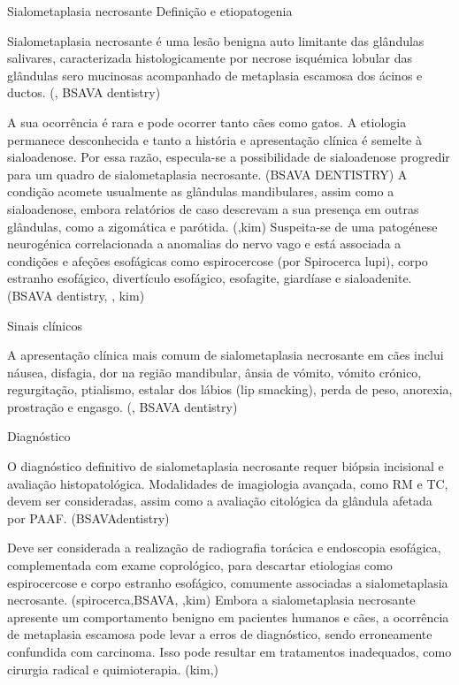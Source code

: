 Sialometaplasia necrosante
Definição e etiopatogenia


Sialometaplasia necrosante é uma lesão benigna auto limitante das glândulas salivares, caracterizada histologicamente	por necrose isquémica lobular das glândulas sero mucinosas acompanhado de metaplasia escamosa dos ácinos e ductos. (\cite{Mukaratirwa2015}, BSAVA dentistry) 


A sua ocorrência é rara e pode ocorrer tanto cães como gatos. A etiologia permanece desconhecida e tanto a história e apresentação clínica é semel\cite{Han2016}te à sialoadenose. Por essa razão, especula-se a possibilidade de sialoadenose progredir para um quadro de sialometaplasia necrosante. (BSAVA DENTISTRY) A condição acomete usualmente as glândulas mandibulares, assim como a sialoadenose, embora relatórios de caso descrevam a sua presença em outras glândulas, como a zigomática e parótida. (\cite{cvj},kim) Suspeita-se de uma patogénese neurogénica correlacionada a anomalias do nervo vago  e está associada a condições e afeções esofágicas como espirocercose (por Spirocerca lupi), corpo estranho esofágico, divertículo esofágico, esofagite, giardíase e sialoadenite. (BSAVA dentistry, \cite{schoroeder}, kim)


Sinais clínicos


A apresentação clínica mais comum de sialometaplasia necrosante em cães inclui náusea, disfagia, dor na região mandibular, ânsia de vómito, vómito crónico, regurgitação, ptialismo, estalar dos lábios (lip smacking), perda de peso, anorexia, prostração e engasgo. (\cite{Mukaratirwa2015}, BSAVA dentistry) 


Diagnóstico


O diagnóstico definitivo de sialometaplasia necrosante requer biópsia incisional e avaliação histopatológica. Modalidades de imagiologia avançada, como RM e TC, devem ser consideradas, assim como a avaliação citológica da glândula afetada por PAAF. (BSAVAdentistry) 


Deve ser considerada a realização de radiografia torácica e endoscopia esofágica, complementada com exame coprológico, para descartar etiologias como espirocercose e corpo estranho esofágico, comumente associadas a sialometaplasia necrosante. (spirocerca,BSAVA, \cite{schoroeder},kim) Embora a sialometaplasia necrosante apresente um comportamento benigno em pacientes humanos e cães, a ocorrência de metaplasia escamosa pode levar a erros de diagnóstico, sendo erroneamente confundida com carcinoma. Isso pode resultar em tratamentos inadequados, como cirurgia radical e quimioterapia. (kim,\cite{Mukaratirwa2015})


